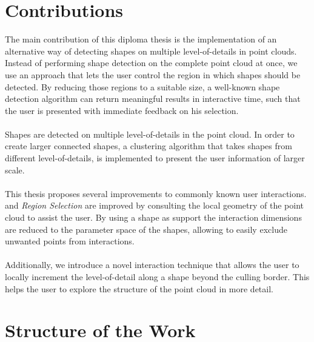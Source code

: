

\section{Contributions}
The main contribution of this diploma thesis is the implementation of an alternative way of detecting shapes on multiple level-of-details in point clouds. Instead of performing shape detection on the complete point cloud at once, we use an approach that lets the user control the region in which shapes should be detected. By reducing those regions to a suitable size, a well-known shape detection algorithm can return meaningful results in interactive time, such that the user is presented with immediate feedback on his selection. 
\\
\\
Shapes are detected on multiple level-of-details in the point cloud. In order to create larger connected shapes, a clustering algorithm that takes shapes from different level-of-details, is implemented to present the user information of larger scale. 
\\
\\
This thesis proposes several improvements to commonly known user interactions.  and \textit{Region Selection} are improved by consulting the local geometry of the point cloud to assist the user. By using a shape as support the interaction dimensions are reduced to the parameter space of the shapes, allowing to easily exclude unwanted points from interactions. 
\\
\\
Additionally, we introduce a novel interaction technique that allows the user to locally increment the level-of-detail along a shape beyond the culling border. This helps the user to explore the structure of the point cloud in more detail. 


\section{Structure of the Work}




